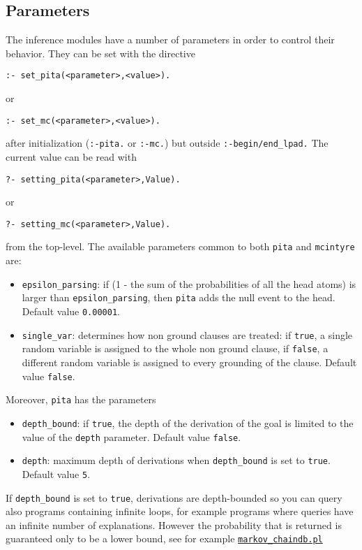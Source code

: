 \subsection{Parameters}
The inference modules have a number of parameters in order to control their behavior. They can be set with the directive
\begin{verbatim}
:- set_pita(<parameter>,<value>).
\end{verbatim}
or
\begin{verbatim}
:- set_mc(<parameter>,<value>).
\end{verbatim}
after initialization (\verb|:-pita.| or \verb|:-mc.|) but outside \verb|:-begin/end_lpad.|
The current value can be read with
\begin{verbatim}
?- setting_pita(<parameter>,Value).
\end{verbatim}
or
\begin{verbatim}
?- setting_mc(<parameter>,Value).
\end{verbatim}
from the top-level.
The available parameters common to both \verb|pita| and \verb|mcintyre| are:
\begin{itemize}
\item 
	 \verb|epsilon_parsing|: if (1 - the sum of the probabilities of all the head atoms) is larger than 
    \verb|epsilon_parsing|,
		then \texttt{pita} adds the null event to the head. Default value \texttt{0.00001}.
\item \verb|single_var|: determines how non ground clauses are treated: if \texttt{true}, a single random variable is assigned to the whole non ground clause, 
if \texttt{false}, a different random variable is assigned to every grounding of the clause. Default value \texttt{false}.
\end{itemize}
Moreover, \verb|pita| has the parameters
\begin{itemize}
\item \verb|depth_bound|: if \texttt{true}, the depth of the derivation of the goal is limited to the value of the \texttt{depth} parameter.  Default value \texttt{false}.
\item  \texttt{depth}: maximum depth of derivations when  \verb|depth_bound| is set to \texttt{true}. Default value \texttt{5}.
\end{itemize}
If \verb|depth_bound| is set to \verb|true|, derivations are depth-bounded so you can query also programs
containing infinite loops, for example programs where queries have an infinite number of explanations. However the probability that is returned is guaranteed only to be a lower bound,
see for example \href{http://cplint.lamping.unife.it/example/inference/markov_chaindb.pl}{\texttt{markov\_chaindb.pl}}

